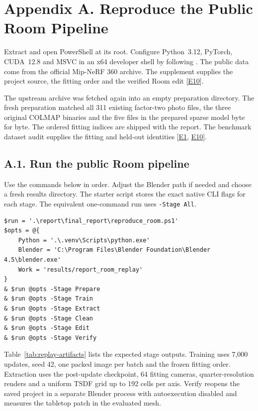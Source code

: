 \section*{Appendix A. Reproduce the Public Room Pipeline}
Extract  and open PowerShell at its root. Configure Python~3.12, PyTorch, CUDA~12.8 and MSVC in an x64 developer shell by following . The public data come from the official Mip-NeRF 360 archive. The supplement supplies the project source, the fitting order and the verified Room edit [\hyperlink{evE10}{E10}].

The upstream archive was fetched again into an empty preparation directory. The fresh preparation matched all 311 existing factor-two photo files, the three original COLMAP binaries and the five files in the prepared sparse model byte for byte. The ordered fitting indices are shipped with the report. The benchmark dataset audit supplies the fitting and held-out identities [\hyperlink{evE1}{E1}, \hyperlink{evE10}{E10}].

\subsection*{A.1. Run the public Room pipeline}
Use the commands below in order. Adjust the Blender path if needed and choose a fresh results directory. The starter script stores the exact native CLI flags for each stage. The equivalent one-command run uses \texttt{-Stage All}.

{\small
\begin{verbatim}
$run = '.\report\final_report\reproduce_room.ps1'
$opts = @{
    Python = '.\.venv\Scripts\python.exe'
    Blender = 'C:\Program Files\Blender Foundation\Blender 4.5\blender.exe'
    Work = 'results/report_room_replay'
}
& $run @opts -Stage Prepare
& $run @opts -Stage Train
& $run @opts -Stage Extract
& $run @opts -Stage Clean
& $run @opts -Stage Edit
& $run @opts -Stage Verify
\end{verbatim}
}
Table~\ref{tab:replay-artifacts} lists the expected stage outputs. Training uses 7,000 updates, seed 42, one packed image per batch and the frozen fitting order. Extraction uses the post-update checkpoint, 64 fitting cameras, quarter-resolution renders and a uniform TSDF grid up to 192 cells per axis. Verify reopens the saved project in a separate Blender process with autoexecution disabled and measures the tabletop patch in the evaluated mesh.

